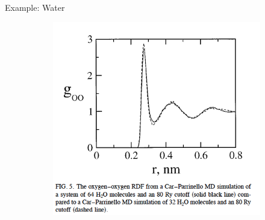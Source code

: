 \documentclass[aspectratio=169]{beamer}
\begin{document}
\begin{frame}{Example: Water}
\begin{figure}
    \centering
    \begin{subfigure}{0.45\textwidth}
        \centering
        \includegraphics[width=\linewidth]{lectures/figures/13-H2O_1.png}
    \end{subfigure}
    \begin{subfigure}{0.2\textwidth}
        \centering

\end{subfigure}
\end{figure}
\end{frame}
\end{document}
